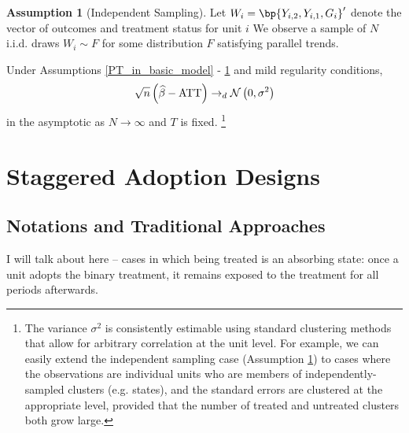 \documentclass[12pt]{article}
\newcommand{\highlightB}[1]{{\emph{\color{MyBlue}{#1}}}}
\theoremstyle{definition}
\newtheorem{assumption}{Assumption}
\begin{document}
\begin{assumption}[Independent Sampling] \label{sampling_in_basic_model}
    Let $W_i = \bp{Y_{i,2}, Y_{i,1}, G_i}^{\prime}$ denote the vector of outcomes and treatment status for unit $i$ We observe a sample of $N$ i.i.d. draws $W_i \sim F$ for some distribution $F$ satisfying parallel trends.
\end{assumption}

Under Assumptions \ref{PT_in_basic_model} - \ref{sampling_in_basic_model} and mild regularity conditions, 
\begin{equation}
    \notag 
    \sqrt{n}\left(\widehat{\beta}-\operatorname*{ATT}\right) \rightarrow_d \mathcal{N}\left(0, \sigma^2\right)
\end{equation}
in the asymptotic as $N \rightarrow \infty$ and $T$ is fixed. \footnote{The variance $\sigma^2$ is consistently estimable using standard clustering methods that allow for arbitrary correlation at the unit level. For example, we can easily extend the independent sampling case (Assumption \ref{sampling_in_basic_model}) to cases where the observations are individual units who are members of independently-sampled clusters (e.g. states), and the standard errors are clustered at the appropriate level, provided that the number of treated and untreated clusters both grow large.}


\setcounter{equation}{0}

\section{Staggered Adoption Designs}

\subsection{Notations and Traditional Approaches}

I will talk about \highlightB{staggered adoption designs} here -- cases in which being treated is an absorbing state: once a unit adopts the binary treatment, it remains exposed to the treatment for all periods afterwards.
\end{document}
